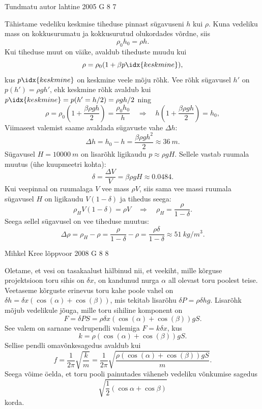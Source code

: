 \documentclass[11pt]{article}
\begin{document}
{%
{Tundmatu autor} %
{lahtine} %
{2005} %
{G 8} %
{7} %
{

\ifSolution
\osa Tähistame vedeliku keskmise tiheduse pinnast sügavuseni $h$ kui $\rho$. Kuna vedeliku mass on kokkusurumatu ja kokkusurutud olukordades võrdne, siis
\[
\rho_{0} h_{0}=\rho h.
\]
Kui tiheduse muut on väike, avaldub tiheduste muudu kui
\[
\rho = \rho_0 (1 + \beta p\idx{keskmine}),
\]
kus $p\idx{keskmine}$ on keskmine veele mõju rõhk. Vee rõhk sügavusel $h'$ on $p(h') = \rho gh'$, ehk keskmine rõhk avaldub kui $p\idx{keskmine} = p(h' = h/2) = \rho gh/2$ ning
\[
\rho=\rho_{0}\left(1+\frac{\beta \rho g h}{2}\right)=\frac{\rho_{0} h_{0}}{h} \quad \Rightarrow \quad h\left(1+\frac{\beta \rho g h}{2}\right)=h_{0},
\]
Viimasest valemist saame avaldada sügavuste vahe $\Delta h$:
\[
\Delta h=h_{0}-h=\frac{\beta \rho g h^{2}}{2} \approx \SI{36}{m}.
\]
\osa Sügavusel $H = \SI{10000}{m}$ on lisarõhk ligikaudu $p \approx \rho gH$. Sellele vastab ruumala muutus (ühe kuupmeetri kohta): 
\[
\delta=\frac{\Delta V}{V}=\beta \rho g H \approx \num{0,0484}.
\]
Kui veepinnal on ruumalaga $V$ vee mass $\rho V$, siis sama vee massi ruumala sügavusel $H$ on ligikaudu $V (1 - \delta )$ ja tihedus seega:
\[
\rho_{H} V(1-\delta)=\rho V \quad \Rightarrow \quad \rho_{H}=\frac{\rho}{1-\delta}.
\]
Seega sellel sügavusel on vee tiheduse muutus: 
\[
\Delta \rho=\rho_{H}-\rho=\frac{\rho}{1-\delta}-\rho=\frac{\rho \delta}{1-\delta} \approx \SI{51}{kg/m^3}.
\]
\fi
}

{Mihkel Kree} %
{lõppvoor} %
{2008} %
{G 8} %
{8} %
{

\ifSolution
Oletame, et vesi on tasakaalust hälbinud nii, et veekiht, mille kõrguse projektsioon toru sihis on $\delta x$, on kandunud nurga $\alpha$ all olevast toru poolest teise. Veetaseme kõrguste erinevus toru kahe poole vahel on $\delta h = \delta x (\cos (\alpha ) + \cos (\beta ))$, mis tekitab lisarõhu $\delta P = \rho \delta hg$. Lisarõhk mõjub vedelikule jõuga, mille toru sihiline komponent on
\[
F = \delta P S = \rho \delta x (\cos (\alpha ) + \cos (\beta )) gS.
\]
See valem on sarnane vedrupendli valemiga $F = k\delta x$, kus 
\[
k = \rho (\cos (\alpha ) + \cos (\beta )) gS.
\]
Sellise pendli omavõnkesagedus avaldub kui
\[
f = \frac{1}{2\pi} \sqrt{\frac{k}{m}} = \frac{1}{2\pi} \sqrt{\frac{\rho(\cos(\alpha)+\cos(\beta))gS}{m}}.
\]
Seega võime öelda, et toru pooli painutades väheneb vedeliku võnkumise sagedus
\[
\sqrt{\frac{1}{2}(\cos \alpha + \cos \beta)}
\]
korda.
\fi
}
\newpage
}
\end{document}

